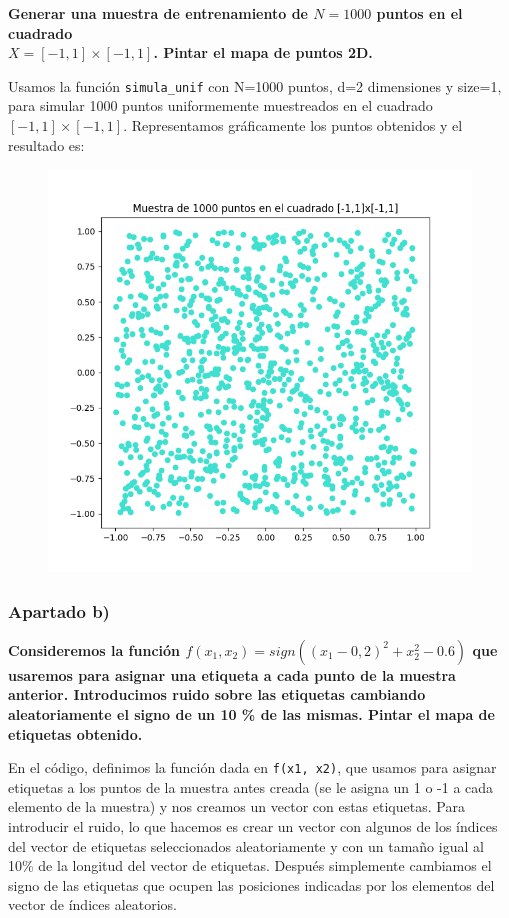 \documentclass[a4]{article}
\begin{document}
\textbf{Generar una muestra de entrenamiento de $ N = 1000 $ puntos en el cuadrado\\
$ X = [-1, 1] \times [-1, 1] $. Pintar el mapa de puntos 2D.}

Usamos la función \lstinline|simula_unif| con N=1000 puntos, d=2 dimensiones y size=1, para simular 1000 puntos uniformemente muestreados en el cuadrado $[-1, 1] \times [-1, 1] $. Representamos gráficamente los puntos obtenidos y el resultado es:

\begin{figure}[H]
	\centering
	\includegraphics[width=0.8\linewidth]{img/Figure_7}
	\caption{}
	\label{fig:figure7}
\end{figure}

\subsubsection{Apartado b)}
\textbf{Consideremos la función $f (x_1 , x_2 ) = sign((x_1 - 0,2)^2 + x_2^2 - 0.6)$ que usaremos
para asignar una etiqueta a cada punto de la muestra anterior. Introducimos
ruido sobre las etiquetas cambiando aleatoriamente el signo de un 10 \% de las
mismas. Pintar el mapa de etiquetas obtenido.}

En el código, definimos la función dada en \lstinline|f(x1, x2)|, que usamos para asignar etiquetas a los puntos de la muestra antes creada (se le asigna un 1 o -1 a cada elemento de la muestra) y nos creamos un vector con estas etiquetas. Para introducir el ruido, lo que hacemos es crear un vector con algunos de los índices del vector de etiquetas seleccionados aleatoriamente y con un tamaño igual al 10\% de la longitud del vector de etiquetas. Después simplemente cambiamos el signo de las etiquetas que ocupen las posiciones indicadas por los elementos del vector de índices aleatorios. 
\end{document}
